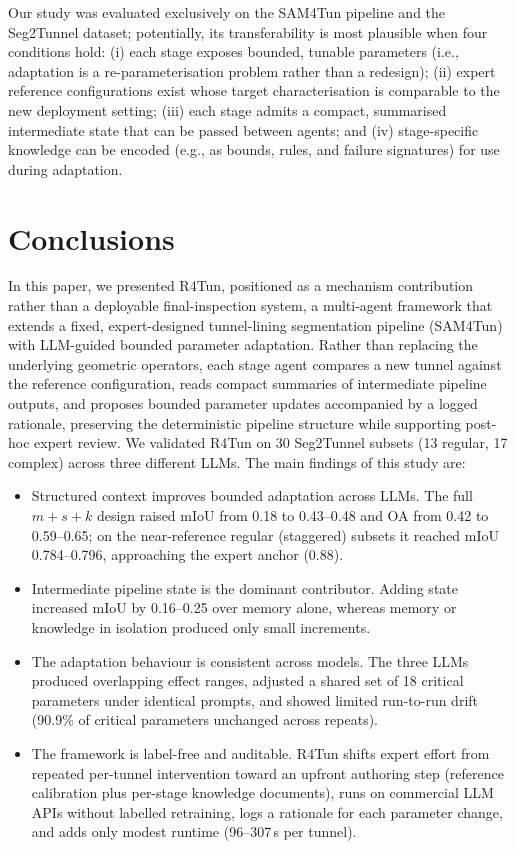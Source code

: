 \documentclass[a4paper,fleqn]{cas-dc}
\begin{document}
{Our study was evaluated exclusively on the SAM4Tun pipeline and the Seg2Tunnel dataset; potentially, its transferability is most plausible when four conditions hold: (i) each stage exposes bounded, tunable parameters (i.e., adaptation is a re-parameterisation problem rather than a redesign); (ii) expert reference configurations exist whose target characterisation is comparable to the new deployment setting; (iii) each stage admits a compact, summarised intermediate state that can be passed between agents; and (iv) stage-specific knowledge can be encoded (e.g., as bounds, rules, and failure signatures) for use during adaptation.

\section{Conclusions}\label{sec:conclusions}

In this paper, we presented R4Tun, positioned as a mechanism contribution rather than a deployable final-inspection system, a multi-agent framework that extends a fixed, expert-designed tunnel-lining segmentation pipeline (SAM4Tun) with LLM-guided bounded parameter adaptation. Rather than replacing the underlying geometric operators, each stage agent compares a new tunnel against the reference configuration, reads compact summaries of intermediate pipeline outputs, and proposes bounded parameter updates accompanied by a logged rationale, preserving the deterministic pipeline structure while supporting post-hoc expert review. We validated R4Tun on 30 Seg2Tunnel subsets (13 regular, 17 complex) across three different LLMs. The main findings of this study are:

\begin{itemize}
\item Structured context improves bounded adaptation across LLMs. The full \mbox{$m+s+k$} design raised mIoU from 0.18 to 0.43--0.48 and OA from 0.42 to 0.59--0.65; on the near-reference regular (staggered) subsets it reached mIoU 0.784--0.796, approaching the expert anchor (0.88).
\item Intermediate pipeline state is the dominant contributor. Adding state increased mIoU by 0.16--0.25 over memory alone, whereas memory or knowledge in isolation produced only small increments.
\item The adaptation behaviour is consistent across models. The three LLMs produced overlapping effect ranges, adjusted a shared set of 18 critical parameters under identical prompts, and showed limited run-to-run drift (90.9\% of critical parameters unchanged across repeats).
\item The framework is label-free and auditable. R4Tun shifts expert effort from repeated per-tunnel intervention toward an upfront authoring step (reference calibration plus per-stage knowledge documents), runs on commercial LLM APIs without labelled retraining, logs a rationale for each parameter change, and adds only modest runtime (96--307\,s per tunnel).
\end{itemize}

}
\end{document}
